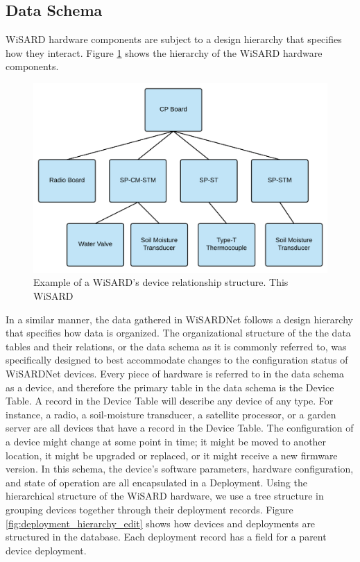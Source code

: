 \subsection{Data Schema}
WiSARD hardware components are subject to a design hierarchy that specifies how they interact. Figure \ref{fig:device_hierarchy_edit} shows the hierarchy of the WiSARD hardware components. 

\begin{figure}[H]
	\centering
	\includegraphics[width=\textwidth]{figures/wisard_device_hierarchy.png}
	\caption{Example of a WiSARD's device relationship structure. This WiSARD }
	\label{fig:device_hierarchy_edit}
\end{figure}

In a similar manner, the data gathered in WiSARDNet follows a design hierarchy that specifies how data is organized. The organizational structure of the the data tables and their relations, or the data schema as it is commonly referred to, was specifically designed to best accommodate changes to the configuration status of WiSARDNet devices. Every piece of hardware is referred to in the data schema as a device, and therefore the primary table in the data schema is the Device Table. A record in the Device Table will describe any device of any type. For instance, a radio, a soil-moisture transducer, a satellite processor, or a garden server are all devices that have a record in the Device Table. The configuration of a device might change at some point in time; it might be moved to another location, it might be upgraded or replaced, or it might receive a new firmware version. In this schema, the device's software parameters, hardware configuration, and state of operation are all encapsulated in a Deployment. Using the hierarchical structure of the WiSARD hardware, we use a tree structure in grouping devices together through their deployment records. Figure \ref{fig:deployment_hierarchy_edit} shows how devices and deployments are structured in the database. Each deployment record has a field for a parent device deployment. 

